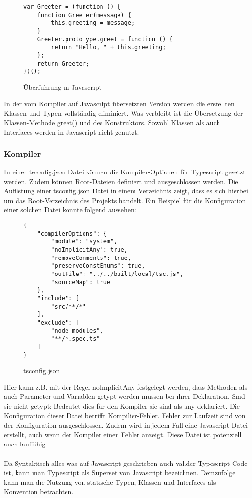 \begin{figure}[t]
\begin{lstlisting}
var Greeter = (function () {
    function Greeter(message) {
        this.greeting = message;
    }
    Greeter.prototype.greet = function () {
        return "Hello, " + this.greeting;
    };
    return Greeter;
})(); 
\end{lstlisting}
\caption{Überführung in Javascript \cite{typescript-example}}
\end{figure}

\noindent
In der vom Kompiler auf Javascript übersetzten Version werden die erstellten Klassen und Typen vollständig eliminiert. Was verbleibt ist die Übersetzung der Klassen-Methode greet() und des Konstruktors. Sowohl Klassen als auch Interfaces werden in Javascript nicht genutzt.

\subsubsection{Kompiler}
In einer tsconfig.json Datei können die Kompiler-Optionen für Typescript gesetzt werden. Zudem können Root-Dateien definiert und ausgeschlossen werden. Die Auflistung einer tsconfig.json Datei in einem Verzeichnis zeigt, dass es sich hierbei um das Root-Verzeichnis des Projekts handelt. Ein Beispiel für die Konfiguration einer solchen Datei könnte folgend aussehen: 

\begin{figure}[h!]
\begin{lstlisting}
{
    "compilerOptions": {
        "module": "system",
        "noImplicitAny": true,
        "removeComments": true,
        "preserveConstEnums": true,
        "outFile": "../../built/local/tsc.js",
        "sourceMap": true
    },
    "include": [
        "src/**/*"
    ],
    "exclude": [
        "node_modules",
        "**/*.spec.ts"
    ]
}  
\end{lstlisting}
\caption{tsconfig.json \cite{tsconfig}}
\end{figure}

\noindent
Hier kann z.B. mit der Regel \glqq noImplicitAny\grqq{} festgelegt werden, dass Methoden als auch Parameter und Variablen getypt werden müssen bei ihrer Deklaration. Sind sie nicht getypt: Bedeutet dies für den Kompiler sie sind als any deklariert.
\noindent
Die Konfiguration dieser Datei betrifft Kompilier-Fehler. Fehler zur Laufzeit sind von der Konfiguration ausgeschlossen. Zudem wird in jedem Fall eine Javascript-Datei erstellt, auch wenn der Kompiler einen Fehler anzeigt. Diese Datei ist potenziell auch lauffähig.\\\\
\noindent
Da Syntaktisch alles was auf Javascript geschrieben auch valider Typescript Code ist, kann man Typescript als Superset von Javascript bezeichnen. Demzufolge kann man die Nutzung von statische Typen, Klassen und Interfaces als Konvention betrachten.

